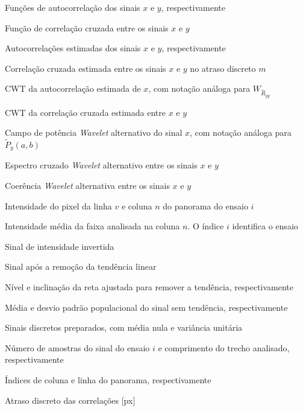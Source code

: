 \begin{simbolos}
  \item[$R_{xx}$, $R_{yy}$] Funções de autocorrelação dos sinais $x$ e $y$,
  respectivamente
  \item[$R_{xy}(\tau)$] Função de correlação cruzada entre os sinais $x$ e $y$
  \item[$\widehat R_{xx}$, $\widehat R_{yy}$] Autocorrelações estimadas dos sinais
  $x$ e $y$, respectivamente
  \item[{$\widehat R_{xy}[m]$}] Correlação cruzada estimada entre os sinais $x$ e $y$
  no atraso discreto $m$
  \item[$W_{\widehat R_{xx}}$] CWT da autocorrelação estimada de $x$,
  com notação análoga para $W_{\widehat R_{yy}}$
  \item[$W_{\widehat R_{xy}}$] CWT da correlação cruzada estimada entre $x$ e $y$
  \item[$\widetilde{P}_x(a,b)$] Campo de potência \textit{Wavelet} alternativo do sinal $x$,
  com notação análoga para $\widetilde P_y(a,b)$
  \item[$\widetilde{C}_{xy}(a,b)$] Espectro cruzado \textit{Wavelet} alternativo entre os sinais $x$ e $y$
  \item[$\widetilde{\gamma}_{xy}(a,b)$] Coerência \textit{Wavelet} alternativa entre os sinais $x$ e $y$
  \item[{$A_i[v,n]$}] Intensidade do pixel da linha $v$ e coluna $n$
  do panorama do ensaio $i$
  \item[{$I_i[n]$, $I[n]$}] Intensidade média da faixa analisada na coluna $n$.
  O índice $i$ identifica o ensaio
  \item[{$J[n]$}] Sinal de intensidade invertida
  \item[{$d[n]$}] Sinal após a remoção da tendência linear
  \item[$\widehat\alpha$, $\widehat\beta$] Nível e inclinação da reta ajustada
  para remover a tendência, respectivamente
  \item[$\bar d$, $s_d$] Média e desvio padrão populacional do sinal sem tendência,
  respectivamente
  \item[{$x[n]$, $y[n]$}] Sinais discretos preparados, com média nula e
  variância unitária
  \item[$N_i$, $N$] Número de amostras do sinal do ensaio $i$ e comprimento
  do trecho analisado, respectivamente
  \item[$n$, $v$] Índices de coluna e linha do panorama, respectivamente
  \item[$m$] Atraso discreto das correlações [px]

\end{simbolos}
